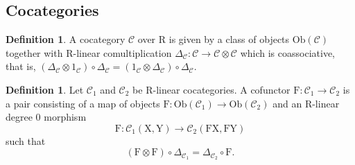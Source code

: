 \documentclass{article}
\theoremstyle{plain}
\theoremstyle{definition}
\newtheorem{definition}[theorem]{Definition}
\theoremstyle{remark}
\newcommand{\mr}{\mathrm}
\newcommand{\3}{\vspace{3mm}}
\newcommand{\2}{\vspace{2mm}}
\newcommand{\1}{\vspace{1mm}}
\begin{document}
\subsection{Cocategories}

\begin{definition}
A cocategory $\mathcal{C}$ over $\mr{R}$ is given by a class of objects $\mr{Ob}(\mathcal{C})$ together with $\mr{R}$-linear comultiplication $\Delta_\mathcal{C} : \mathcal{C}\to \mathcal{C}\otimes \mathcal{C}$ which is coassociative, that is, $\left(\Delta_\mathcal{C}\otimes 1_\mathcal{C}\right)\circ \Delta_\mathcal{C} = \left(1_\mathcal{C}\otimes \Delta_\mathcal{C}\right)\circ \Delta_\mathcal{C}$.
\end{definition}
\2
\begin{definition}
Let $\mathcal{C}_1$ and $\mathcal{C}_2$ be $\mr{R}$-linear cocategories. A cofunctor $\mr{F}:\mathcal{C}_1\to\mathcal{C}_2$ is a pair consisting of a map of objects $\mr{F}:\mr{Ob}(\mathcal{C}_1)\to\mr{Ob}(\mathcal{C}_2)$ and an $\mr{R}$-linear degree $0$ morphism  $$\mr{F}:\mathcal{C}_1(\mr{X},\mr{Y})\to \mathcal{C}_2(\mr{FX},\mr{FY})$$ such that $$\left(\mr{F}\otimes \mr{F}\right)\circ \Delta_{\mathcal{C}_1}=\Delta_{\mathcal{C}_2}\circ \mr{F}.$$
\end{definition}
\end{document}
